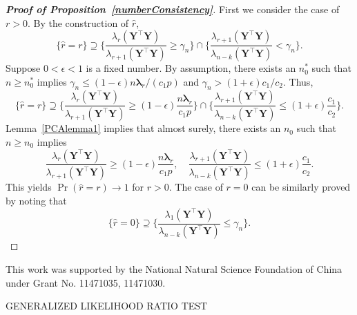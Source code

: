 \documentclass[12pt]{article} %
\newcommand{\bY}{\mathbf{Y}}
\newcommand{\bfsym}[1]{\ensuremath{\boldsymbol{#1}}}
\def\blambda {\bfsym {\lambda}}
\theoremstyle{definition}
\begin{document}
\begin{appendices}
\begin{proof}[\textbf{Proof of Proposition~\ref{numberConsistency}}]
    First we consider the case of $r>0$. By the construction of $\hat{r}$,
    $$
    \{\hat{r}=r\}\supseteq 
    \{\frac{\lambda_{r}(\bY^\top \bY)}{\lambda_{r+1}(\bY^\top \bY)}\geq \gamma_n\}
    \cap
    \{\frac{\lambda_{r+1}(\bY^\top \bY)}{\lambda_{n-k}(\bY^\top \bY)}< \gamma_n\}.
    $$
    Suppose $0<\epsilon< 1$ is a fixed number.
    By assumption, there exists an $n_0^*$ such that $n\geq n_0^*$ implies $\gamma_n\leq (1-\epsilon)n\blambda_r/(c_1 p)$ and $\gamma_n> (1+\epsilon) c_1/c_2 $. Thus,
    $$
    \{\hat{r}=r\}\supseteq 
    \{\frac{\lambda_{r}(\bY^\top \bY)}{\lambda_{r+1}(\bY^\top \bY)}\geq (1-\epsilon)\frac{n\blambda_r}{c_1 p}\}
    \cap
    \{\frac{\lambda_{r+1}(\bY^\top \bY)}{\lambda_{n-k}(\bY^\top \bY)}\leq (1+\epsilon) \frac{c_1}{c_2} \}.
    $$
     Lemma~\ref{PCAlemma1} implies that almost surely, there exists an $n_0$ such that $n\geq n_0$ implies
    $$\frac{\lambda_r(\bY^\top \bY)}{\lambda_{r+1}(\bY^\top \bY)}\geq (1-\epsilon)\frac{n\blambda_r}{c_1 p},
    \quad
    \frac{\lambda_{r+1}(\bY^\top \bY)}{\lambda_{n-k}(\bY^\top \bY)}\leq (1+\epsilon)\frac{c_1}{c_2}.
    $$
    This yields $\Pr(\hat{r}=r)\to 1$ for $r>0$.
    The case of $r=0$ can be similarly proved by noting that
    $$
    \{\hat{r}=0\}\supseteq 
    \{\frac{\lambda_{1}(\bY^\top \bY)}{\lambda_{n-k}(\bY^\top \bY)}\leq \gamma_n\}.
    $$
\end{proof}



\end{appendices}
%
\vskip 14pt
This work was supported by the National Natural Science Foundation of
China under Grant No. 11471035, 11471030.
\par

{\hfill {\footnotesize\rm GENERALIZED LIKELIHOOD RATIO TEST} \hfill}
\end{document}
